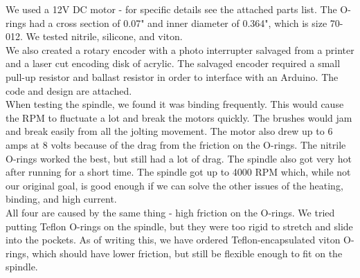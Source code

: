 \documentclass[12pt]{report}
\begin{document}
We used a 12V DC motor - for specific details see the attached parts list. The O-rings had a cross section of 0.07" and inner diameter of 0.364", which is size 70-012. We tested nitrile, silicone, and viton. \\
We also created a rotary encoder with a photo interrupter salvaged from a printer and a laser cut encoding disk of acrylic. The salvaged encoder required a small pull-up resistor and ballast resistor in order to interface with an Arduino. The code and design are attached. \\
When testing the spindle, we found it was binding frequently. This would cause the RPM to fluctuate a lot and break the motors quickly. The brushes would jam and break easily from all the jolting movement. The motor also drew up to 6 amps at 8 volts because of the drag from the friction on the O-rings. The nitrile O-rings worked the best, but still had a lot of drag. The spindle also got very hot after running for a short time. The spindle got up to 4000 RPM which, while not our original goal, is good enough if we can solve the other issues of the heating, binding, and high current. \\
All four are caused by the same thing - high friction on the O-rings. We tried putting Teflon O-rings on the spindle, but they were too rigid to stretch and slide into the pockets. As of writing this, we have ordered Teflon-encapsulated viton O-rings, which should have lower friction, but still be flexible enough to fit on the spindle. 
\end{document}

